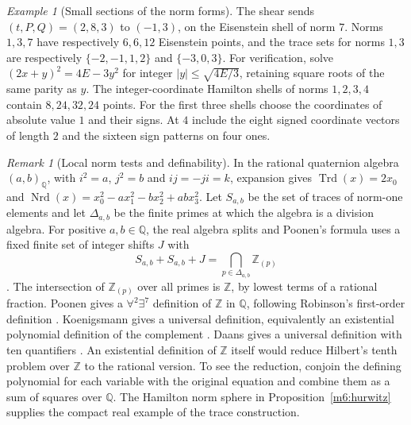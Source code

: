 \documentclass[11pt,reqno]{amsart}
\theoremstyle{definition}
\theoremstyle{remark}
\newtheorem{remark}[theorem]{Remark}
\newtheorem{example}[theorem]{Example}
\numberwithin{equation}{section}
\newcommand{\Q}{\mathbb{Q}}
\newcommand{\Z}{\mathbb{Z}}
\begin{document}
\begin{example}[Small sections of the norm forms]\label{m6:norm-example}
The shear sends \((t,P,Q)=(2,8,3)\) to \((-1,3)\), on the
Eisenstein shell of norm \(7\). Norms \(1,3,7\) have respectively
\(6,6,12\) Eisenstein points, and the trace sets for norms \(1,3\)
are respectively \(\{-2,-1,1,2\}\) and \(\{-3,0,3\}\).
For verification, solve \((2x+y)^2=4E-3y^2\) for integer
\(|y|\le\sqrt{4E/3}\), retaining square roots of the same parity as \(y\).
The integer-coordinate Hamilton shells of norms \(1,2,3,4\)
contain \(8,24,32,24\) points. For the first three shells choose
the coordinates of absolute value \(1\) and their signs. At \(4\)
include the eight signed coordinate vectors of length \(2\) and
the sixteen sign patterns on four ones.
\end{example}

\begin{remark}[Local norm tests and definability]\label{m6:definability}
In the rational quaternion algebra \((a,b)_\Q\), with \(i^2=a\),
\(j^2=b\) and \(ij=-ji=k\), expansion gives
\(\operatorname{Trd}(x)=2x_0\) and
\(\operatorname{Nrd}(x)=x_0^2-a x_1^2-b x_2^2+ab x_3^2\).
Let \(S_{a,b}\) be the set of traces of norm-one elements and let
\(\Delta_{a,b}\) be the finite primes at which the algebra is a
division algebra. For positive \(a,b\in\Q\), the real algebra splits
and Poonen's formula uses a fixed finite set of integer shifts \(J\)
with
\[
 S_{a,b}+S_{a,b}+J
 =\bigcap_{p\in\Delta_{a,b}}\Z_{(p)}
\]
\cite[proof of the main theorem]{m6:Poonen}. The intersection of
\(\Z_{(p)}\) over all primes is \(\Z\), by lowest terms of a rational
fraction. Poonen gives a \(\forall^2\exists^7\) definition of \(\Z\)
in \(\Q\), following Robinson's first-order definition
\cite{m6:Robinson,m6:Poonen}. Koenigsmann gives a universal
definition, equivalently an existential polynomial definition of
the complement \cite[Theorem~1]{m6:Koenigsmann}. Daans gives a
universal definition with ten quantifiers \cite{m6:Daans}.
An existential definition of \(\Z\) itself would reduce Hilbert's
tenth problem over \(\Z\) to the rational version. To see the
reduction, conjoin the defining polynomial for each variable
with the original equation and combine them as a sum of squares
over \(\Q\). The Hamilton norm sphere in
Proposition~\ref{m6:hurwitz} supplies the compact real example of
the trace construction.
\end{remark}
\end{document}
